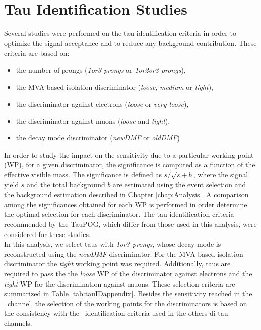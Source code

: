 \chapter{Tau Identification Studies}
\label{chap:TauIDStudies}

\noindent Several studies were performed on the tau identification
criteria in order to optimize the signal acceptance 
and to reduce any background contribution. These criteria 
are based on:

\begin{itemize}
 \item the number of prongs (\textit{1or3-prongs} or \textit{1or2or3-prongs}),
 \item the MVA-based isolation discriminator (\textit{loose}, \textit{medium} or \textit{tight}),
 \item the discriminator against electrons (\textit{loose} or \textit{very loose}),
 \item the discriminator against muons (\textit{loose} and \textit{tight}),
 \item the decay mode discriminator (\textit{newDMF} or \textit{oldDMF})
\end{itemize}

\noindent In order to study the impact on the sensitivity due to a particular 
working point (WP), for a  given discriminator, the significance is computed
as a function of the effective visible mass. The significance is defined as $s/\sqrt{s + b}$, where the signal 
yield $s$ and the total background $b$ are estimated using 
the event selection and the background estimation described in 
Chapter \ref{chap:Analysis}. A comparison among the 
significances obtained for each WP is performed in order
determine the optimal selection for each discriminator. The tau 
identification criteria recommended by the TauPOG, which differ from those used 
in this analysis, were considered for these studies. \\

\noindent In this analysis, we select taus with \textit{1or3-prongs}, whose decay 
mode is reconstructed using the \textit{newDMF} discriminator. For the 
MVA-based isolation discriminator the \textit{tight} working point 
was required. Additionally, taus are required to pass the 
the \textit{loose} WP of the discriminator against electrons and the \textit{tight} 
WP for the discrimination against muons. These selection criteria 
are summarized in Table \ref{tab:tauIDappendix}. Besides 
the sensitivity reached in the \Zprimetotauh~channel,
the selection of the working points for the discriminators is 
based on the consistency with the \tauh~identification criteria 
used in the others di-tau channels. 

